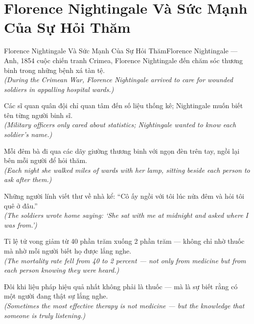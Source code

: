 \section{Florence Nightingale Và Sức Mạnh Của Sự Hỏi Thăm}
\begin{truyen}{Florence Nightingale Và Sức Mạnh Của Sự Hỏi Thăm}{Florence Nightingale --- Anh, 1854}
 cuộc chiến tranh Crimea, Florence Nightingale đến chăm sóc thương binh trong những bệnh xá tàn tệ.\\[4pt]
\textit{(During the Crimean War, Florence Nightingale arrived to care for wounded soldiers in appalling hospital wards.)}

Các sĩ quan quân đội chỉ quan tâm đến số liệu thống kê; Nightingale muốn biết tên từng người binh sĩ.\\[4pt]
\textit{(Military officers only cared about statistics; Nightingale wanted to know each soldier's name.)}

Mỗi đêm bà đi qua các dãy giường thương binh với ngọn đèn trên tay, ngồi lại bên mỗi người để hỏi thăm.\\[4pt]
\textit{(Each night she walked miles of wards with her lamp, sitting beside each person to ask after them.)}

Những người lính viết thư về nhà kể: ``Cô ấy ngồi với tôi lúc nửa đêm và hỏi tôi quê ở đâu.''\\[4pt]
\textit{(The soldiers wrote home saying: `She sat with me at midnight and asked where I was from.')}

Tỉ lệ tử vong giảm từ 40 phần trăm xuống 2 phần trăm --- không chỉ nhờ thuốc mà nhờ mỗi người biết họ được lắng nghe.\\[4pt]
\textit{(The mortality rate fell from 40 to 2 percent --- not only from medicine but from each person knowing they were heard.)}

\end{truyen}
\begin{baihoc}
  Đôi khi liệu pháp hiệu quả nhất không phải là thuốc --- mà là sự biết rằng có một người đang thật sự lắng nghe.\\[4pt]
  \textit{(Sometimes the most effective therapy is not medicine --- but the knowledge that someone is truly listening.)}
\end{baihoc}

